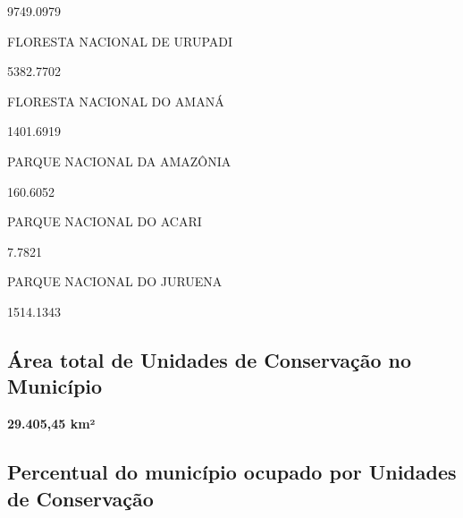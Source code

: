 \documentclass[
  letterpaper,
]{report}
\begin{document}
9749.0979

\n    

\n    

\n      

FLORESTA NACIONAL DE URUPADI

\n      

5382.7702

\n    

\n    

\n      

FLORESTA NACIONAL DO AMANÁ

\n      

1401.6919

\n    

\n    

\n      

PARQUE NACIONAL DA AMAZÔNIA

\n      

160.6052

\n    

\n    

\n      

PARQUE NACIONAL DO ACARI

\n      

7.7821

\n    

\n    

\n      

PARQUE NACIONAL DO JURUENA

\n      

1514.1343

\n    

\n  

\n

\hypertarget{uxe1rea-total-de-unidades-de-conservauxe7uxe3o-no-municuxedpio}{%
\subsection{Área total de Unidades de Conservação no
Município}\label{uxe1rea-total-de-unidades-de-conservauxe7uxe3o-no-municuxedpio}}

\textbf{29.405,45 km²}

\hypertarget{percentual-do-municuxedpio-ocupado-por-unidades-de-conservauxe7uxe3o}{%
\subsection{Percentual do município ocupado por Unidades de
Conservação}\label{percentual-do-municuxedpio-ocupado-por-unidades-de-conservauxe7uxe3o}}
\end{document}

